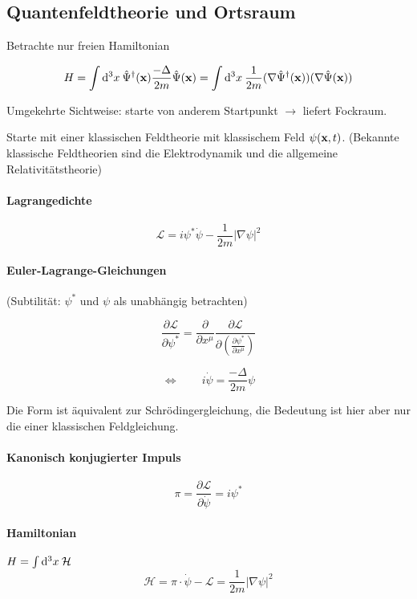 \documentclass[11pt,a4paper]{report}
\begin{document}
\subsection{Quantenfeldtheorie und Ortsraum}

Betrachte nur freien Hamiltonian

$$H = \int\mathrm{d}^3x\:\hat{\Psi}^\dagger (\mathbf{x})\frac{-\Delta}{2m}\hat{\Psi} (\mathbf{x}) = \int\mathrm{d}^3x\:\frac{1}{2m}(\nabla\hat{\Psi}^\dagger (\mathbf{x}))(\nabla\hat{\Psi} (\mathbf{x}))$$

Umgekehrte Sichtweise: starte von anderem Startpunkt $\longrightarrow$ liefert Fockraum.\par 

Starte mit einer klassischen Feldtheorie mit klassischem Feld $\psi (\mathbf{x},t)$. (Bekannte klassische Feldtheorien sind die Elektrodynamik und die allgemeine Relativitätstheorie)

\paragraph{Lagrangedichte}

$$\mathcal{L}=i\psi^*\dot{\psi}-\frac{1}{2m}|\nabla\psi |^2$$

\newcommand{\lag}{\mathcal{L}}

\paragraph{Euler-Lagrange-Gleichungen} (Subtilität: $\psi^*$ und $\psi$ als unabhängig betrachten)

$$\frac{\partial\lag}{\partial\psi^*}=\frac{\partial}{\partial x^\mu}\frac{\partial\lag}{\partial\left(\frac{\partial\psi^*}{\partial x^\mu}\right)}$$

$$\Longleftrightarrow\qquad i\dot{\psi}=\frac{-\Delta}{2m}\psi$$

Die Form ist äquivalent zur Schrödingergleichung, die Bedeutung ist hier aber nur die einer klassischen Feldgleichung.\par 

\paragraph{Kanonisch konjugierter Impuls}
$$\pi = \frac{\partial\lag}{\partial\dot{\psi}}=i\psi^*$$

\paragraph{Hamiltonian} $H=\int\mathrm{d}^3x\:\mathcal{H}$
$$\mathcal{H}=\pi\cdot\dot{\psi}-\lag=\frac{1}{2m}|\nabla\psi |^2$$
\end{document}
